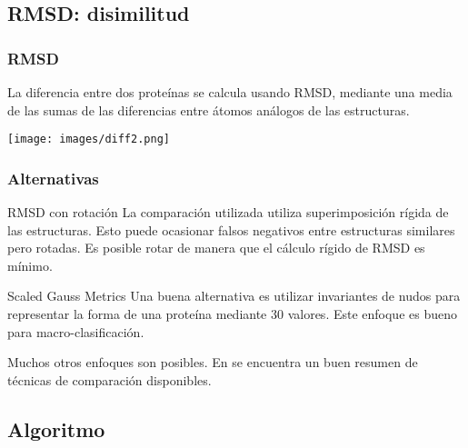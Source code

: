 \documentclass[xcolor=pdftex,dvipsnames,table,10pt,babel,spanish]{beamer}
\begin{document}
\subsection{RMSD: disimilitud}

\begin{frame}
\frametitle{RMSD}

La diferencia entre dos prote\'inas se calcula usando RMSD, mediante una media de las sumas de las diferencias entre \'atomos an\'alogos de las estructuras\cite{rmsd}.

\pause
\begin{center}
\texttt{[image: images/diff2.png]}
\end{center}

\end{frame}

\begin{frame}
 \frametitle{Alternativas}
 
\begin{exampleblock}{RMSD con rotaci\'on}
La comparaci\'on utilizada utiliza superimposici\'on r\'igida de las estructuras. Esto puede ocasionar falsos negativos entre estructuras similares pero rotadas. Es posible rotar de manera que el c\'alculo r\'igido de RMSD es m\'inimo\cite{superimposition}.
\end{exampleblock}

\pause

\begin{exampleblock}{Scaled Gauss Metrics}
Una buena alternativa es utilizar invariantes de nudos para representar la forma de una prote\'ina mediante 30 valores. Este enfoque es bueno para macro-clasificaci\'on\cite{gauss}.
\end{exampleblock}

\pause

Muchos otros enfoques son posibles. En \cite{koehl} se encuentra un buen resumen de t\'ecnicas de comparaci\'on disponibles.

\end{frame}

\subsection{Algoritmo}
\end{document}
